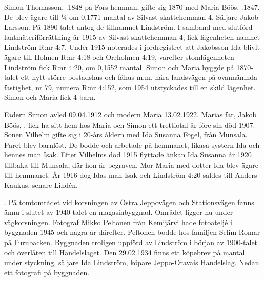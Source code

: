 Simon Thomasson, .1848 på Fors hemman, gifte sig 1870 med	Maria Böös, .1847. De blev ägare till ¼ om 0,1771 mantal av Silvast skattehemman 4. Säljare Jakob Larsson. På 1890-talet antog de tillnamnet Lindström. I samband med slutförd lantmäteriförrättning år 1915 av Silvast skattehemman 4, fick lägenheten namnet Lindström R:nr 4:7. Under 1915 noterades i jordregistret att Jakobsson Ida blivit ägare till Holmen R:nr 4:18 och Orrholmen 4:19, varefter stomlägenheten Lindström fick R:nr 4:20, om 0,1552 mantal. Simon och Maria byggde på 1870-talet ett nytt större bostadshus och fähus m.m. nära landsvägen på ovannämnda fastighet, nr 79, numera R:nr 4:152, som 1954 utstyckades till en skild lägenhet. Simon och Maria fick 4 barn.
\begin{jhchildren}
  \item {}
  \item {}
  \item {}
  \item {}
\end{jhchildren}
Fadern Simon avled 09.04.1912 och modern Maria 13.02.1922. Marias far, Jakob Böös, , fick ha sitt hem hos Maria och Simon ett trettiotal år före sin död 1907. Sonen Vilhelm gifte sig i 20-års åldern med Ida Susanna Fogel, från Munsala. Paret blev barnlöst. De bodde och arbetade på hemmanet, likaså systern Ida och hennes man Isak. Efter Vilhelms död 1915 flyttade änkan Ida Susanna år 1920 tillbaka till Munsala, där hon är begraven. Mor Maria med dotter Ida blev ägare till hemmanet. År 1916 dog Idas man Isak och Lindström 4:20 såldes till Anders Kaukus, senare Lindén.


  .
På tomtområdet vid korsningen av Östra Jeppovägen och Stationsvägen fanns ännu i slutet av 1940-talet en magasinbyggnad. Området ligger nu under vägkorsningen. Fotograf Mikko Peltonen från Kemijärvi hade fotoateljé i byggnaden 1945 och några år därefter. Peltonen bodde hos familjen Selim Romar på Furubacken. Byggnaden troligen uppförd av Lindström i början av 1900-talet och överlåten till Handelslaget. Den 29.02.1934 finns ett köpebrev på mantal under styckning, säljare Ida Lindström, köpare Jeppo-Oravais Handelslag. Nedan ett fotografi på byggnaden.




